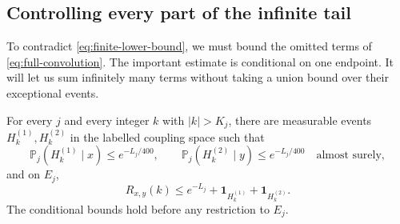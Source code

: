 \subsection{Controlling every part of the infinite tail}

To contradict \eqref{eq:finite-lower-bound}, we must bound the omitted
terms of \eqref{eq:full-convolution}. The important estimate is conditional
on one endpoint. It will let us sum infinitely many terms without taking
a union bound over their exceptional events.

\begin{lemma}\label{lem:tail-attenuation}
For every $j$ and every integer $k$ with $|k|>K_j$, there are measurable
events $H_k^{(1)},H_k^{(2)}$ in the labelled coupling space such that
\begin{equation}\label{eq:conditional-bad-events}
 \mathbb P_j(H_k^{(1)}\mid x)\le e^{-L_j/400},\qquad
 \mathbb P_j(H_k^{(2)}\mid y)\le e^{-L_j/400}
 \quad\text{almost surely},
\end{equation}
and on $E_j$,
\begin{equation}\label{eq:tail-ratio-bound}
 R_{x,y}(k)\le e^{-L_j}
       +\mathbf 1_{H_k^{(1)}}+\mathbf 1_{H_k^{(2)}}.
\end{equation}
The conditional bounds hold before any restriction to $E_j$.
\end{lemma}

